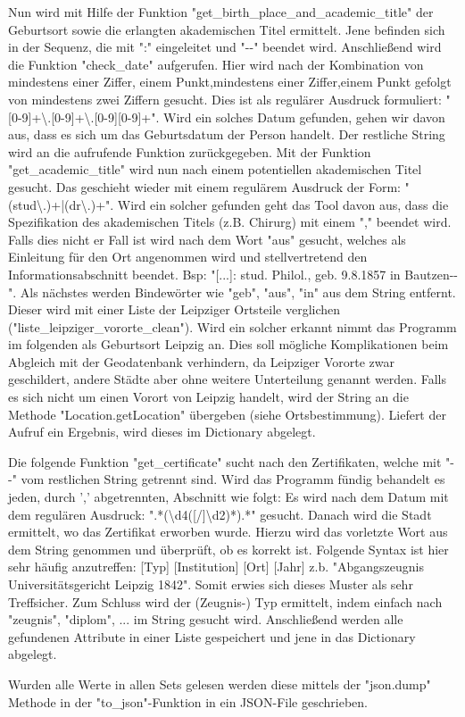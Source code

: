 Nun wird mit Hilfe der Funktion "{}get\_birth\_place\_and\_academic\_title"{} der Geburtsort sowie die erlangten akademischen Titel ermittelt. Jene befinden sich in der Sequenz, die mit "{}:"{} eingeleitet und "{}-{}-"{} beendet wird. Anschließend wird die Funktion "{}check\_date"{} aufgerufen. Hier wird nach der Kombination von mindestens einer Ziffer, einem Punkt,mindestens einer Ziffer,einem Punkt gefolgt von mindestens zwei Ziffern gesucht. Dies ist als regulärer Ausdruck formuliert: "{}[0-9]+\textbackslash.[0-9]+\textbackslash.[0-9][0-9]+"{}. Wird ein solches Datum gefunden, gehen wir davon aus, dass es sich um das Geburtsdatum der Person handelt. Der restliche String wird an die aufrufende Funktion zurückgegeben.
Mit der Funktion "{}get\_academic\_title"{} wird nun nach einem potentiellen akademischen Titel gesucht. Das geschieht wieder mit einem regulärem Ausdruck der Form: "{}(stud\textbackslash.)+|(dr\textbackslash.)+"{}. Wird ein solcher gefunden geht das Tool davon aus, dass die Spezifikation des akademischen Titels (z.B. Chirurg) mit einem "{},"{} beendet wird. Falls dies nicht er Fall ist wird nach dem Wort "{}aus"{} gesucht, welches als Einleitung für den Ort angenommen wird und stellvertretend den Informationsabschnitt beendet. Bsp: "{}[...]: stud. Philol., geb. 9.8.1857 in Bautzen-{}-"{}.
Als nächstes werden Bindewörter wie "{}geb"{}, "{}aus"{}, "{}in"{} aus dem String entfernt. Dieser wird mit einer Liste der Leipziger Ortsteile verglichen ("{}liste\_leipziger\_vororte\_clean"{}). Wird ein solcher erkannt nimmt das Programm im folgenden als Geburtsort Leipzig an. Dies soll mögliche Komplikationen beim Abgleich mit der Geodatenbank verhindern, da Leipziger Vororte zwar geschildert, andere Städte aber ohne weitere Unterteilung genannt werden. Falls es sich nicht um einen Vorort von Leipzig handelt, wird der String an die Methode "{}Location.getLocation"{} übergeben (siehe Ortsbestimmung). Liefert der Aufruf ein Ergebnis, wird dieses im Dictionary abgelegt.

Die folgende Funktion "{}get\_certificate"{} sucht nach den Zertifikaten, welche mit "-{}-" vom restlichen String getrennt sind. Wird das Programm fündig behandelt es jeden, durch '{},'{} abgetrennten, Abschnitt wie folgt:
Es wird nach dem Datum mit dem regulären Ausdruck: "{}.*(\textbackslash{}d{4}([/]\textbackslash{}d{2})*).*"{} gesucht. Danach wird die Stadt ermittelt, wo das Zertifikat erworben wurde. Hierzu wird das vorletzte Wort aus dem String genommen und überprüft, ob es korrekt ist. Folgende Syntax ist hier sehr häufig anzutreffen: [Typ] [Institution] [Ort] [Jahr] z.b. "{}Abgangszeugnis Universitätsgericht Leipzig 1842"{}. Somit erwies sich dieses Muster als sehr Treffsicher. Zum Schluss wird der (Zeugnis-) Typ ermittelt, indem einfach nach "{}zeugnis"{}, "{}diplom"{}, ... im String gesucht wird. Anschließend werden alle gefundenen Attribute in einer Liste gespeichert und jene in das Dictionary abgelegt.

Wurden alle Werte in allen Sets gelesen werden diese mittels der "{}json.dump"{} Methode in der "{}to\_json"{}-Funktion in ein JSON-File geschrieben.
